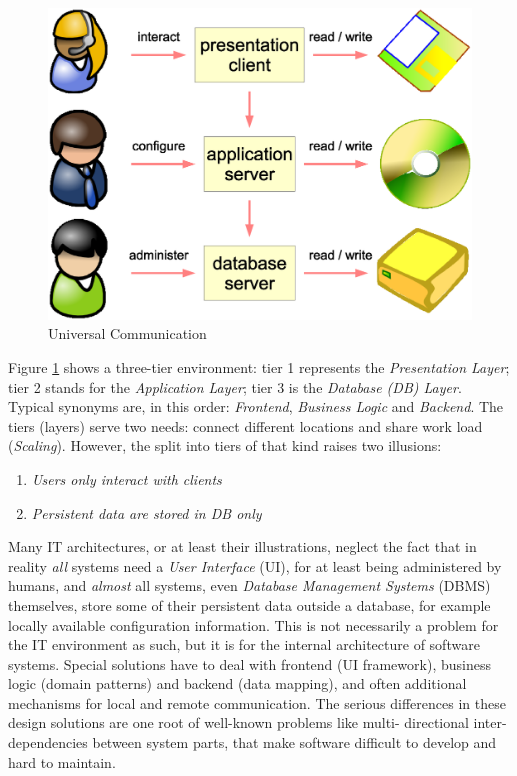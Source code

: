 \begin{figure}[ht]
    \begin{center}
        \includegraphics[scale=0.2]{vector/misleading.eps}
        \caption{Universal Communication}
        \label{misleading_figure}
    \end{center}
\end{figure}

Figure \ref{misleading_figure} shows a three-tier environment: tier 1 represents
the \emph{Presentation Layer}; tier 2 stands for the \emph{Application Layer};
tier 3 is the \emph{Database (DB) Layer}. Typical synonyms are, in this order:
\emph{Frontend}, \emph{Business Logic} and \emph{Backend}. The tiers (layers)
serve two needs: connect different locations and share work load (\emph{Scaling}).
However, the split into tiers of that kind raises two illusions:

\begin{enumerate}
    \item \emph{Users only interact with clients}
    \item \emph{Persistent data are stored in DB only}
\end{enumerate}

Many IT architectures, or at least their illustrations, neglect the fact that
in reality \emph{all} systems need a \emph{User Interface} (UI), for at least
being administered by humans, and \emph{almost} all systems, even
\emph{Database Management Systems} (DBMS) themselves, store some of their
persistent data outside a database, for example locally available configuration
information. This is not necessarily a problem for the IT environment as such,
but it is for the internal architecture of software systems. Special solutions
have to deal with frontend (UI framework), business logic (domain patterns) and
backend (data mapping), and often additional mechanisms for local and remote
communication. The serious differences in these design solutions are one root
of well-known problems like multi- directional inter-dependencies between system
parts, that make software difficult to develop and hard to maintain.

